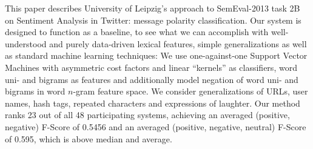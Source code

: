 This paper describes University of Leipzig's approach to SemEval-2013 task 2B on Sentiment Analysis in Twitter: message polarity classification. Our system
 is designed to function as a baseline, to see what we can accomplish with
 well-understood and purely data-driven lexical features, simple generalizations
 as well as standard machine learning techniques: We use one-against-one Support
 Vector Machines with asymmetric cost factors and linear ``kernels'' as
 classifiers, word uni- and bigrams as features and additionally model negation
 of word uni- and bigrams in word $n$-gram feature space. We consider
 generalizations of URLs, user names, hash tags, repeated characters and
 expressions of laughter. Our method ranks 23 out of all 48 participating
 systems, achieving an averaged (positive, negative) F-Score of 0.5456 and an
 averaged (positive, negative, neutral) F-Score of 0.595, which is above median
 and average.


